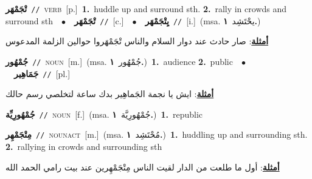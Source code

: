 \documentclass[10pt,a4paper,twoside]{article} %
\begin{document}
\begin{multicols}{2}
{\setlength\topsep{0pt}\textbf{\foreignlanguage{arabic}{تْجَمْهَر}}\ {\color{gray}\texttt{//}\color{black}}\ \textsc{verb}\ [p.]\ \textbf{1.}~huddle up and surround sth.  \textbf{2.}~rally in crowds and surround sth\ \ $\bullet$\ \ \setlength\topsep{0pt}\textbf{\foreignlanguage{arabic}{تْجَمْهَر}}\ {\color{gray}\texttt{//}\color{black}}\ [c.]\ \ $\bullet$\ \ \setlength\topsep{0pt}\textbf{\foreignlanguage{arabic}{يِتْجَمْهَر}}\ {\color{gray}\texttt{//}\color{black}}\ [i.]\ \color{gray}(msa. \foreignlanguage{arabic}{يحْتَشِد}~\foreignlanguage{arabic}{\textbf{١.}})\color{black}\  \begin{flushright}\color{gray}\foreignlanguage{arabic}{\textbf{\underline{\foreignlanguage{arabic}{أمثلة}}}: صار حادث عند دوار السلام والناس تْجَمْهَروا حوالين الزلمة المدعوس}\end{flushright}\color{black}} \vspace{2mm}

{\setlength\topsep{0pt}\textbf{\foreignlanguage{arabic}{جُمْهُور}}\ {\color{gray}\texttt{//}\color{black}}\ \textsc{noun}\ [m.]\ \color{gray}(msa. \foreignlanguage{arabic}{جُمْهُور}~\foreignlanguage{arabic}{\textbf{١.}})\color{black}\ \textbf{1.}~audience  \textbf{2.}~public\ \ $\bullet$\ \ \setlength\topsep{0pt}\textbf{\foreignlanguage{arabic}{جَمَاهِير}}\ {\color{gray}\texttt{//}\color{black}}\ [pl.]\  \begin{flushright}\color{gray}\foreignlanguage{arabic}{\textbf{\underline{\foreignlanguage{arabic}{أمثلة}}}: ايش يا نجمة الجَماهِير بدك ساعة لتخلصي رسم حالك}\end{flushright}\color{black}} \vspace{2mm}

{\setlength\topsep{0pt}\textbf{\foreignlanguage{arabic}{جُمْهُورِيِّة}}\ {\color{gray}\texttt{//}\color{black}}\ \textsc{noun}\ [f.]\ \color{gray}(msa. \foreignlanguage{arabic}{جُمْهُورِيَّة}~\foreignlanguage{arabic}{\textbf{١.}})\color{black}\ \textbf{1.}~republic\ } \vspace{2mm}

{\setlength\topsep{0pt}\textbf{\foreignlanguage{arabic}{مِتْجَمْهِر}}\ {\color{gray}\texttt{//}\color{black}}\ \textsc{noun\textunderscore act}\ [m.]\ \color{gray}(msa. \foreignlanguage{arabic}{مُحْتَشِد}~\foreignlanguage{arabic}{\textbf{١.}})\color{black}\ \textbf{1.}~huddling up and surrounding sth.  \textbf{2.}~rallying in crowds and surrounding sth\  \begin{flushright}\color{gray}\foreignlanguage{arabic}{\textbf{\underline{\foreignlanguage{arabic}{أمثلة}}}: أول ما طلعت من الدار لقيت الناس مِتْجَمْهِرين عند بيت رامي الحمد الله}\end{flushright}\color{black}} \vspace{2mm}


\end{multicols}
\end{document}
